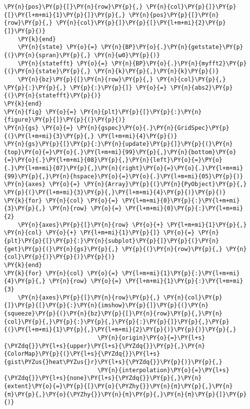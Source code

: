 \begin{Verbatim}[commandchars=\\\{\}]
           \PY{n}{pos}\PY{p}{[}\PY{n}{row}\PY{p}{,} \PY{n}{col}\PY{p}{]}\PY{p}{[}\PY{l+m+mi}{1}\PY{p}{]}\PY{p}{,} \PY{n}{pos}\PY{p}{[}\PY{n}{row}\PY{p}{,} \PY{n}{col}\PY{p}{]}\PY{p}{[}\PY{l+m+mi}{2}\PY{p}{]}\PY{p}{)}
    \PY{k}{end}
    \PY{n}{state} \PY{o}{=} \PY{n}{BP}\PY{o}{.}\PY{n}{getstate}\PY{p}{(}\PY{n}{spran}\PY{p}{,} \PY{n}{ω0}\PY{p}{)}
    \PY{n}{statefft} \PY{o}{=} \PY{n}{BP}\PY{o}{.}\PY{n}{myfft2}\PY{p}{(}\PY{n}{state}\PY{p}{,} \PY{n}{k}\PY{p}{,}\PY{n}{k}\PY{p}{)}
    \PY{n}{bz}\PY{p}{[}\PY{n}{row}\PY{p}{,} \PY{n}{col}\PY{p}{,} \PY{p}{:}\PY{p}{,} \PY{p}{:}\PY{p}{]} \PY{o}{=} \PY{n}{abs2}\PY{p}{(}\PY{n}{statefft}\PY{p}{)}
\PY{k}{end}
\PY{n}{fig} \PY{o}{=} \PY{n}{plt}\PY{p}{[}\PY{p}{:}\PY{n}{figure}\PY{p}{]}\PY{p}{(}\PY{p}{)}
\PY{n}{gs} \PY{o}{=} \PY{n}{gspec}\PY{o}{.}\PY{n}{GridSpec}\PY{p}{(}\PY{l+m+mi}{3}\PY{p}{,} \PY{l+m+mi}{4}\PY{p}{)}
\PY{n}{gs}\PY{p}{[}\PY{p}{:}\PY{n}{update}\PY{p}{]}\PY{p}{(}\PY{n}{top}\PY{o}{=}\PY{o}{.}\PY{l+m+mi}{99}\PY{p}{,}\PY{n}{bottom}\PY{o}{=}\PY{o}{.}\PY{l+m+mi}{08}\PY{p}{,}\PY{n}{left}\PY{o}{=}\PY{o}{.}\PY{l+m+mi}{07}\PY{p}{,}\PY{n}{right}\PY{o}{=}\PY{o}{.}\PY{l+m+mi}{99}\PY{p}{,}\PY{n}{hspace}\PY{o}{=}\PY{o}{.}\PY{l+m+mi}{05}\PY{p}{)}
\PY{n}{axes} \PY{o}{=} \PY{n}{Array}\PY{p}{(}\PY{n}{PyObject}\PY{p}{,} \PY{p}{(}\PY{l+m+mi}{3}\PY{p}{,}\PY{l+m+mi}{4}\PY{p}{)}\PY{p}{)}
\PY{k}{for} \PY{n}{col} \PY{o}{=} \PY{l+m+mi}{0}\PY{p}{:}\PY{l+m+mi}{3}\PY{p}{,} \PY{n}{row} \PY{o}{=} \PY{l+m+mi}{0}\PY{p}{:}\PY{l+m+mi}{2}
    \PY{n}{axes}\PY{p}{[}\PY{n}{row} \PY{o}{+} \PY{l+m+mi}{1}\PY{p}{,} \PY{n}{col} \PY{o}{+} \PY{l+m+mi}{1}\PY{p}{]} \PY{o}{=} \PY{n}{plt}\PY{p}{[}\PY{p}{:}\PY{n}{subplot}\PY{p}{]}\PY{p}{(}\PY{n}{get}\PY{p}{(}\PY{n}{gs}\PY{p}{,} \PY{p}{(}\PY{n}{row}\PY{p}{,} \PY{n}{col}\PY{p}{)}\PY{p}{)}\PY{p}{)}
\PY{k}{end}
\PY{k}{for} \PY{n}{col} \PY{o}{=} \PY{l+m+mi}{1}\PY{p}{:}\PY{l+m+mi}{4}\PY{p}{,} \PY{n}{row} \PY{o}{=} \PY{l+m+mi}{1}\PY{p}{:}\PY{l+m+mi}{3}
    \PY{n}{axes}\PY{p}{[}\PY{n}{row}\PY{p}{,} \PY{n}{col}\PY{p}{]}\PY{p}{[}\PY{p}{:}\PY{n}{imshow}\PY{p}{]}\PY{p}{(}\PY{n}{squeeze}\PY{p}{(}\PY{n}{bz}\PY{p}{[}\PY{n}{row}\PY{p}{,}\PY{n}{col}\PY{p}{,}\PY{p}{:}\PY{p}{,}\PY{p}{:}\PY{p}{]}\PY{p}{,}\PY{p}{(}\PY{l+m+mi}{1}\PY{p}{,}\PY{l+m+mi}{2}\PY{p}{)}\PY{p}{)}\PY{p}{,}
                           \PY{n}{origin}\PY{o}{=}\PY{l+s}{\PYZdq{}}\PY{l+s}{upper}\PY{l+s}{\PYZdq{}}\PY{p}{,}\PY{n}{ColorMap}\PY{p}{(}\PY{l+s}{\PYZdq{}}\PY{l+s}{gist\PYZus{}heat\PYZus{}r}\PY{l+s}{\PYZdq{}}\PY{p}{)}\PY{p}{,}
                           \PY{n}{interpolation}\PY{o}{=}\PY{l+s}{\PYZdq{}}\PY{l+s}{none}\PY{l+s}{\PYZdq{}}\PY{p}{,}\PY{n}{extent}\PY{o}{=}\PY{p}{[}\PY{o}{\PYZhy{}}\PY{n}{π}\PY{p}{,}\PY{n}{π}\PY{p}{,}\PY{o}{\PYZhy{}}\PY{n}{π}\PY{p}{,}\PY{n}{π}\PY{p}{]}\PY{p}{)}

\end{Verbatim}
